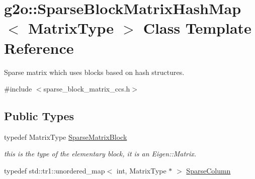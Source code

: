 \hypertarget{classg2o_1_1SparseBlockMatrixHashMap}{}\section{g2o\+:\+:Sparse\+Block\+Matrix\+Hash\+Map$<$ Matrix\+Type $>$ Class Template Reference}
\label{classg2o_1_1SparseBlockMatrixHashMap}


Sparse matrix which uses blocks based on hash structures.  




{\ttfamily \#include $<$sparse\+\_\+block\+\_\+matrix\+\_\+ccs.\+h$>$}

\subsection*{Public Types}
\begin{DoxyCompactItemize}
\item 
typedef Matrix\+Type \hyperlink{classg2o_1_1SparseBlockMatrixHashMap_a03d422844dbf0b10f4fcf7e69fdb0bca}{Sparse\+Matrix\+Block}
\begin{DoxyCompactList}\small\item\em this is the type of the elementary block, it is an Eigen\+::\+Matrix. \end{DoxyCompactList}\item 
typedef std\+::tr1\+::unordered\+\_\+map$<$ int, Matrix\+Type $\ast$ $>$ \hyperlink{classg2o_1_1SparseBlockMatrixHashMap_ae364a722296b90e32dd6c3a8fbeb49ae}{Sparse\+Column}
\end{DoxyCompactItemize}
